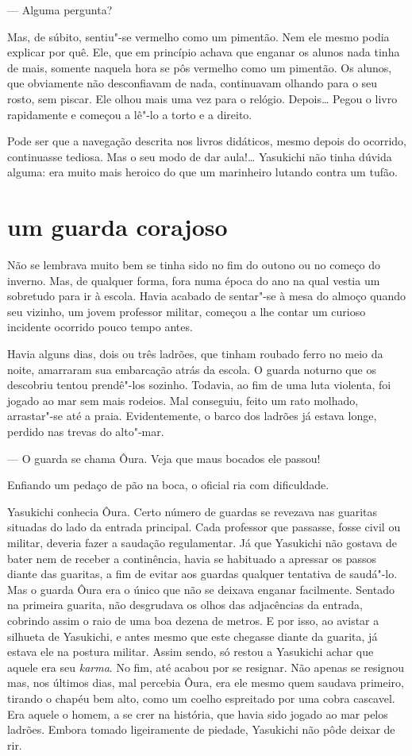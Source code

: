 --- Alguma pergunta?

Mas, de súbito, sentiu"-se vermelho como um pimentão. Nem ele mesmo podia
explicar por quê. Ele, que em princípio achava que enganar os alunos
nada tinha de mais, somente naquela hora se pôs vermelho como um
pimentão. Os alunos, que obviamente não desconfiavam de nada,
continuavam olhando para o seu rosto, sem piscar. Ele olhou mais uma
vez para o relógio. Depois\ldots{} Pegou o livro rapidamente e começou a
lê"-lo a torto e a direito.

Pode ser que a navegação descrita nos livros didáticos, mesmo depois do
ocorrido, continuasse tediosa. Mas o seu modo de dar aula!\ldots{} Yasukichi
não tinha dúvida alguma: era muito mais heroico do que um marinheiro
lutando contra um tufão.

\section*{um guarda corajoso}

Não se lembrava muito bem se tinha sido no fim do outono ou no começo do
inverno. Mas, de qualquer forma, fora numa época do ano na qual vestia
um sobretudo para ir à escola. Havia acabado de sentar"-se à mesa do
almoço quando seu vizinho, um jovem professor militar, começou a lhe
contar um curioso incidente ocorrido pouco tempo antes.

Havia alguns dias, dois ou três ladrões, que tinham roubado ferro no
meio da noite, amarraram sua embarcação atrás da escola. O guarda
noturno que os descobriu tentou prendê"-los sozinho. Todavia, ao fim de
uma luta violenta, foi jogado ao mar sem mais rodeios. Mal conseguiu,
feito um rato molhado, arrastar"-se até a praia. Evidentemente, o barco
dos ladrões já estava longe, perdido nas trevas do alto"-mar.

--- O guarda se chama Ôura. Veja que maus bocados ele passou!

Enfiando um pedaço de pão na boca, o oficial ria com dificuldade.

Yasukichi conhecia Ôura. Certo número de guardas se revezava nas
guaritas situadas do lado da entrada principal. Cada professor que
passasse, fosse civil ou militar, deveria fazer a saudação
regulamentar. Já que Yasukichi não gostava de bater nem de receber a
continência, havia se habituado a apressar os passos diante das
guaritas, a fim de evitar aos guardas qualquer tentativa de saudá"-lo.
Mas o guarda Ôura era o único que não se deixava enganar facilmente.
Sentado na primeira guarita, não desgrudava os olhos das adjacências da
entrada, cobrindo assim o raio de uma boa dezena de metros. E por isso,
ao avistar a silhueta de Yasukichi, e antes mesmo que este chegasse
diante da guarita, já estava ele na postura militar. Assim sendo, só
restou a Yasukichi achar que aquele era seu \textit{karma}. No fim, até
acabou por se resignar. Não apenas se resignou mas, nos últimos dias,
mal percebia Ôura, era ele mesmo quem saudava primeiro, tirando o
chapéu bem alto, como um coelho espreitado por uma cobra cascavel. Era
aquele o homem, a se crer na história, que havia sido jogado ao mar
pelos ladrões. Embora tomado ligeiramente de piedade, Yasukichi não
pôde deixar de rir.

